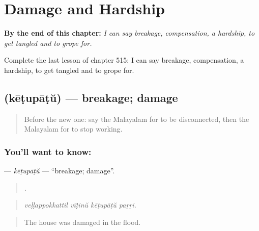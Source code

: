
\chapter{Damage and Hardship}
\label{ch:ml-damage-and-hardship}

\begin{chapteropening}
\textbf{By the end of this chapter:} \emph{I can say breakage, compensation, a hardship, to get tangled and to grope for.}

Complete the last lesson of chapter 515: I can say breakage, compensation, a hardship, to get tangled and to grope for.
\end{chapteropening}

\section[\texorpdfstring{\ml{കേടുപാട്} (kēṭupāṭŭ)}{കേടുപാട് (kēṭupāṭŭ)}]{ (kēṭupāṭŭ) — breakage; damage}

\label{lesson:ML-C515-ketupatu}



\begin{quote}
Before the new one: say the Malayalam for to be disconnected, then the Malayalam for to stop working.
\end{quote}

\subsection*{You'll want to know: }
\textbf{} — \emph{kēṭupāṭŭ} — \textquotedblleft{}breakage; damage\textquotedblright{}.

\begin{quote}
   .
\end{quote}

\begin{quote}
\emph{veḷḷappokkattil vīṭinŭ kēṭupāṭŭ paṟṟi.}
\end{quote}

\begin{quote}
The house was damaged in the flood.
\end{quote}

